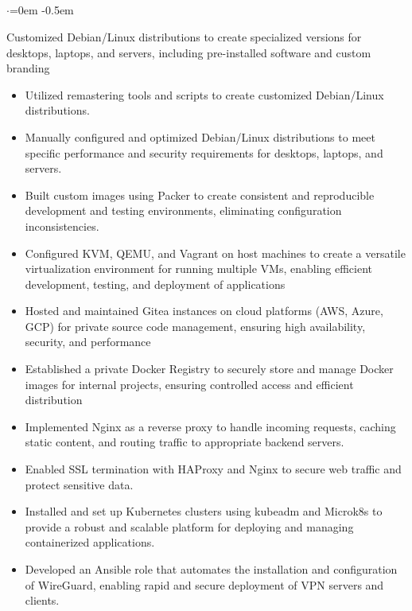 \documentclass{article}
\begin{document}
\subsection*{}
\vspace{-2.6em}
\begin{list}{$\cdot$}{\leftmargin=0em} %
    \itemsep -0.5em \vspace{-0.5em} %
    \item Customized Debian/Linux distributions to create specialized versions for desktops, laptops, and servers, including pre-installed software  and custom branding
\end{list}
\vspace{-1.6em}
\begin{itemize}
    \item Utilized remastering tools and scripts to create customized Debian/Linux distributions.
    \item Manually configured and optimized Debian/Linux distributions to meet specific performance and security requirements for desktops, laptops, and servers.
    \item Built custom images using Packer to create consistent and reproducible development and testing environments, eliminating configuration inconsistencies.
    \item Configured KVM, QEMU, and Vagrant on host machines to create a versatile virtualization environment for running multiple VMs, enabling efficient development, testing, and deployment of applications
    \item Hosted and maintained Gitea instances on cloud platforms (AWS, Azure, GCP) for private source code management, ensuring high availability, security, and performance
    \item Established a private Docker Registry to securely store and manage Docker images for internal projects, ensuring controlled access and efficient distribution
    \item Implemented Nginx as a reverse proxy to handle incoming requests, caching static content, and routing traffic to appropriate backend servers.
    \item Enabled SSL termination with HAProxy and Nginx to secure web traffic and protect sensitive data.
    \item Installed and set up Kubernetes clusters using kubeadm and Microk8s to provide a robust and scalable platform for deploying and managing containerized applications.
    \item Developed an Ansible role that automates the installation and configuration of WireGuard, enabling rapid and secure deployment of VPN servers and clients.
\end{itemize}
\end{document}
